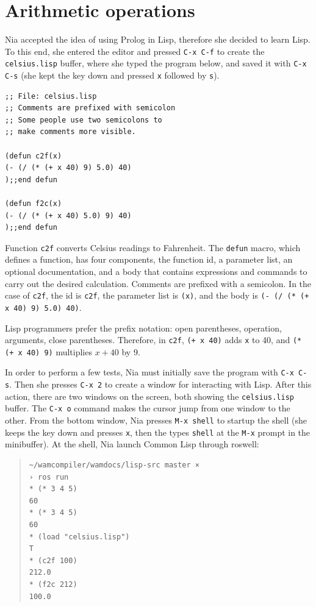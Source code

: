 \documentclass[a4paper,12pt]{book}
\begin{document}
\chapter{Arithmetic operations}
Nia accepted the idea of using Prolog in Lisp,
therefore she decided to learn Lisp. To this end, she
entered the editor and pressed \verb|C-x C-f| to create
the \verb|celsius.lisp| buffer, where she typed the
program below, and saved it with \verb|C-x C-s| (she
kept the  key down and pressed \verb|x|
followed by \verb|s|).
\begin{verbatim}
;; File: celsius.lisp
;; Comments are prefixed with semicolon
;; Some people use two semicolons to
;; make comments more visible.

(defun c2f(x)
(- (/ (* (+ x 40) 9) 5.0) 40)
);;end defun

(defun f2c(x)
(- (/ (* (+ x 40) 5.0) 9) 40)
);;end defun
\end{verbatim}
Function \verb|c2f| converts Celsius readings to
Fahrenheit. The \verb|defun| macro, which defines
a function,  has four components, the function id,
a parameter list, an optional documentation, and a
body that contains expressions and commands to carry
out the desired calculation. Comments are prefixed
with a semicolon. In the case of \verb|c2f|, the id
is \verb|c2f|, the parameter list is \verb|(x)|, and
the body is \verb|(- (/ (* (+ x 40) 9) 5.0) 40)|.

Lisp programmers prefer the prefix notation:
open parentheses, operation, arguments, close parentheses.
Therefore, in  \verb|c2f|,  \verb|(+ x 40)|
adds \verb|x| to 40, and \verb|(* (+ x 40) 9)|
multiplies $x+40$ by 9.

In order to perform a few tests, Nia must initially save
the program with \verb|C-x C-s|. Then she 
presses \verb|C-x 2| to create a window for interacting
with Lisp. After this action, there are two windows on
the screen, both  showing the \verb|celsius.lisp| buffer.
The \verb|C-x o| command makes the cursor jump from one
window to the other. From the bottom window, Nia presses
\verb|M-x shell| to startup the shell (she keeps the
 key down and presses \verb|x|, then the
types \verb|shell| at the \verb|M-x| prompt in
the minibuffer). At the shell, Nia launch Common Lisp
through roswell:
\begin{quote}
\begin{verbatim}
~/wamcompiler/wamdocs/lisp-src master ×
› ros run
* (* 3 4 5)
60
* (* 3 4 5)
60
* (load "celsius.lisp")
T
* (c2f 100)
212.0
* (f2c 212)
100.0
\end{verbatim}
\end{quote}
\end{document}
